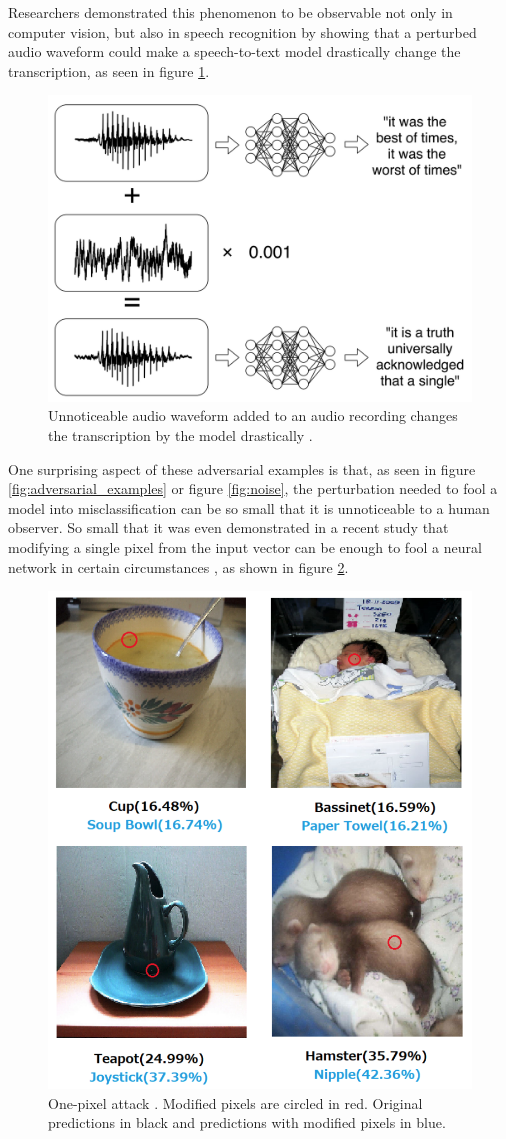 Researchers demonstrated this phenomenon to be observable not only in computer
vision, but also in speech recognition \cite{carlini_audio_2018} by showing that
a perturbed audio waveform could make a speech-to-text model drastically change
the transcription, as seen in figure \ref{fig:carlini_audio}.
\begin{figure}[!htb]
    \centering
    \includegraphics[width=.6\linewidth]{Figures/intro/carlini_noise.png}
    \caption{ Unnoticeable audio waveform added to an audio recording changes
        the transcription by the model drastically \cite{carlini_audio_2018}.}
    \label{fig:carlini_audio}
\end{figure}



One surprising aspect of these adversarial examples is that, as seen in figure
\ref{fig:adversarial_examples} or figure \ref{fig:noise}, the perturbation
needed to fool a model into misclassification can be so small that it is
unnoticeable to a human observer. So small that it was even demonstrated in a
recent study that modifying a single pixel from the input vector can be enough
to fool a neural network in certain circumstances \cite{su_one_2019}, as shown in figure
\ref{fig:su_one_pixel}.

\begin{figure}[!htb]
    \centering
    \includegraphics[width=.6\linewidth]{Figures/intro/su_one_pixel.png}
    \caption{ One-pixel attack \cite{su_one_2019}. Modified pixels are
        circled in red. Original predictions in black and predictions with
        modified pixels in blue.}
    \label{fig:su_one_pixel}
\end{figure}


